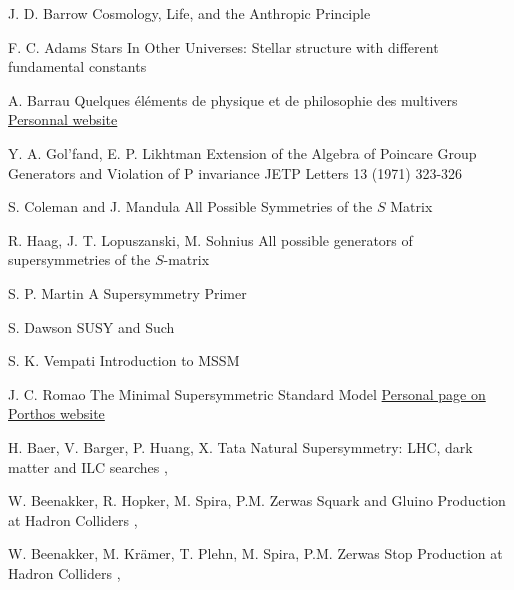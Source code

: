 {J. D. Barrow}
{Cosmology, Life, and the Anthropic Principle}
{}

{F. C. Adams}
{Stars In Other Universes: Stellar structure with different fundamental constants}
{}

{A. Barrau}
{Quelques éléments de physique et de philosophie des multivers}
{\href{http://lpsc.in2p3.fr/barrau/aurelien/multivers_lpsc.pdf}{Personnal website}}

{Y. A. Gol'fand, E. P. Likhtman}
{Extension of the Algebra of Poincare Group Generators and Violation of P invariance}
{JETP Letters 13 (1971) 323-326}

{S. Coleman and J. Mandula}
{All Possible Symmetries of the $S$ Matrix}
{}

{R. Haag, J. T. Lopuszanski, M. Sohnius}
{All possible generators of supersymmetries of the $S$-matrix}
{}

{S. P. Martin}
{A Supersymmetry Primer}
{}

{S. Dawson}
{SUSY and Such}
{}

{S. K. Vempati}
{Introduction to MSSM}
{}

{J. C. Romao}
{The Minimal Supersymmetric Standard Model}
{\href{http://porthos.ist.utl.pt/~romao/homepage/publications/}{Personal page on Porthos website}}

{H. Baer, V. Barger, P. Huang, X. Tata}
{Natural Supersymmetry: LHC, dark matter and ILC searches}
{, }

{W. Beenakker, R. Hopker, M. Spira, P.M. Zerwas}
{Squark and Gluino Production at Hadron Colliders}
{, }

{W. Beenakker, M. Krämer, T. Plehn, M. Spira, P.M. Zerwas}
{Stop Production at Hadron Colliders}
{, }

